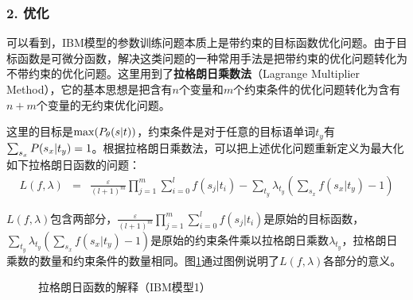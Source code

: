 
\subsubsection {2. 优化}

\parinterval 可以看到，IBM模型的参数训练问题本质上是带约束的目标函数优化问题。由于目标函数是可微分函数，解决这类问题的一种常用手法是把带约束的优化问题转化为不带约束的优化问题。这里用到了{\small\sffamily\bfseries{拉格朗日乘数法}}（Lagrange Multiplier Method），它的基本思想是把含有$n$个变量和$m$个约束条件的优化问题转化为含有$n+m$个变量的无约束优化问题。

\parinterval 这里的目标是$\max({P}_{\theta}({s}|{t}))$，约束条件是对于任意的目标语单词$t_y$有\\$\sum_{s_x}{{P}(s_x|t_y)}=1$。根据拉格朗日乘数法，可以把上述优化问题重新定义为最大化如下拉格朗日函数的问题：
\vspace{-0.5em}
\begin{eqnarray}
L(f,\lambda)&=&\frac{\varepsilon}{(l+1)^m}\prod_{j=1}^{m}\sum_{i=0}^{l}{f(s_j|t_i)}-\sum_{t_y}{\lambda_{t_y}(\sum_{s_x}{f(s_x|t_y)}-1)}
\label{eq:5-30}
\end{eqnarray}

\vspace{-0.3em}
\parinterval $L(f,\lambda)$包含两部分，$\frac{\varepsilon}{(l+1)^m}\prod_{j=1}^{m}\sum_{i=0}^{l}{f(s_j|t_i)}$是原始的目标函数，\\$\sum_{t_y}{\lambda_{t_y}(\sum_{s_x}{f(s_x|t_y)}-1)}$是原始的约束条件乘以拉格朗日乘数$\lambda_{t_y}$，拉格朗日乘数的数量和约束条件的数量相同。图\ref{fig:5-23}通过图例说明了$L(f,\lambda)$各部分的意义。

\begin{figure}[htp]
    \centering

   \caption{拉格朗日函数的解释（IBM模型1）}
   \label{fig:5-23}
\end{figure}

